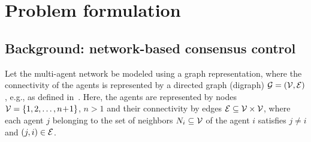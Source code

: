 \documentclass[conference]{IEEEtran}
\begin{document}
\vspace{0.1in}
\section{Problem formulation}
\vspace{-0.01in}


\subsection{Background: network-based consensus control}
\vspace{-0.01in}


Let the multi-agent network be modeled using a graph representation, where 
the connectivity of the agents is represented by 
a directed graph (digraph) 
${\cal{G}} = \left({\cal{V}}, {\cal{E}}\right)$, e.g., as defined in~\cite{Olfati_Murray_07}. 
Here, the  agents are represented by nodes $ {\cal{V}}= \left\{ 1, 2, \ldots, {n\!+\!1} \right\}$, $n>1$ and their connectivity by edges $ {\cal{E}}   \subseteq {\cal{V}} \times {\cal{V}} $, where each agent $j$ belonging to the set of 
neighbors $N_i  \subseteq {\cal{V}} $  of the agent $i$ satisfies  $ j \ne i$ and $(j,i) \in {\cal{E}} $. 



\vspace{0.1in}
\end{document}
